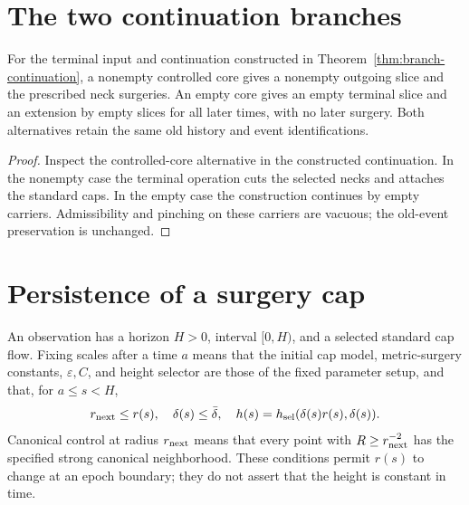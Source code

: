 \section{The two continuation branches}
\label{sec:branch-dichotomy}

\begin{corollary}
\label{prop:unified-branch}
For the terminal input and continuation constructed in
Theorem~\ref{thm:branch-continuation}, a nonempty controlled core gives
a nonempty outgoing slice and the prescribed neck surgeries. An empty
core gives an empty terminal slice and an extension by empty slices
for all later times, with no later surgery. Both alternatives retain
the same old history and event identifications.
\end{corollary}
\begin{proof}
Inspect the controlled-core alternative in the constructed continuation.
In the nonempty case the terminal operation cuts the selected necks and
attaches the standard caps. In the empty case the construction continues
by empty carriers. Admissibility and pinching on these carriers are
vacuous; the old-event preservation is unchanged.
\end{proof}

\section{Persistence of a surgery cap}
\label{sec:cap-persistence}

An observation has a horizon $H>0$, interval $[0,H)$, and a selected
standard cap flow.  Fixing scales after a time $a$ means that the
initial cap model, metric-surgery constants, $\varepsilon,C$, and
height selector are those of the fixed parameter setup, and that,
for $a\leq s<H$,
\[
 r_{\rm next}\leq r(s),\quad \delta(s)\leq\bar\delta,
 \quad h(s)=h_{\rm sel}(\delta(s)r(s),\delta(s)).
\]
Canonical control at radius $r_{\rm next}$ means that every point
with $R\geq r_{\rm next}^{-2}$ has the specified strong canonical
neighborhood.  These conditions permit $r(s)$ to change at an epoch
boundary; they do not assert that the height is constant in time.


